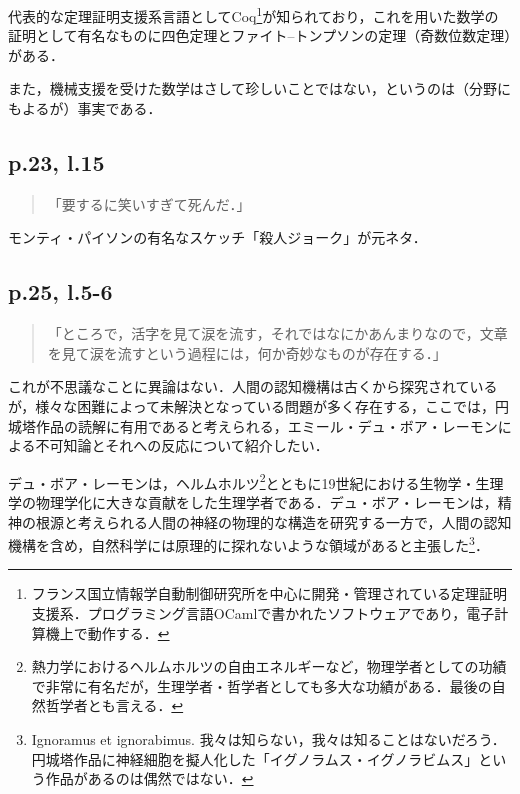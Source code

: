 \documentclass[10pt, a5paper, twoside]{jsarticle}
\theoremstyle{definition}
\begin{document}
			代表的な定理証明支援系言語としてCoq\footnote{フランス国立情報学自動制御研究所を中心に開発・管理されている定理証明支援系．プログラミング言語OCamlで書かれたソフトウェアであり，電子計算機上で動作する．}が知られており，これを用いた数学の証明として有名なものに四色定理とファイト--トンプソンの定理（奇数位数定理）がある．

			また，機械支援を受けた数学はさして珍しいことではない，というのは（分野にもよるが）事実である．

		\subsection{p.23, l.15}

			\begin{quote}
				
				「要するに笑いすぎて死んだ．」

			\end{quote}

			モンティ・パイソンの有名なスケッチ「殺人ジョーク」が元ネタ．

		\subsection{p.25, l.5-6}

			\begin{quote}
				
				「ところで，活字を見て涙を流す，それではなにかあんまりなので，文章を見て涙を流すという過程には，何か奇妙なものが存在する．」

			\end{quote}

			これが不思議なことに異論はない．人間の認知機構は古くから探究されているが，様々な困難によって未解決となっている問題が多く存在する，ここでは，円城塔作品の読解に有用であると考えられる，エミール・デュ・ボア・レーモンによる不可知論とそれへの反応について紹介したい．

			デュ・ボア・レーモンは，ヘルムホルツ\footnote{熱力学におけるヘルムホルツの自由エネルギーなど，物理学者としての功績で非常に有名だが，生理学者・哲学者としても多大な功績がある．最後の自然哲学者とも言える．}とともに19世紀における生物学・生理学の物理学化に大きな貢献をした生理学者である．デュ・ボア・レーモンは，精神の根源と考えられる人間の神経の物理的な構造を研究する一方で，人間の認知機構を含め，自然科学には原理的に探れないような領域があると主張した\footnote{Ignoramus et ignorabimus. 我々は知らない，我々は知ることはないだろう．円城塔作品に神経細胞を擬人化した「イグノラムス・イグノラビムス」という作品があるのは偶然ではない．}\cite{hys,dbr}．
\end{document}
